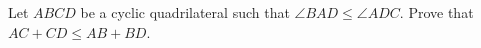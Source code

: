 Let $ABCD$ be a cyclic quadrilateral such that $\angle{BAD}\leq\angle{ADC}$.  Prove that $AC+CD\leq AB+BD$.
